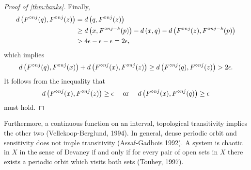\documentclass[12pt,draft,twoside]{book}
\begin{document}
\begin{proof}[Proof of \ref{thm:banks}]
    Finally, 
    \begin{align*}
      d\left( F^{\circ nj}(q), F^{\circ nj}(z) \right) 
      &= d\left( q, F^{\circ nj}(z) \right)  \\
      &\geq  d\left( x, F^{\circ nj-k}(p) \right) - d\left( x,q \right) - d\left( F^{\circ nj}(z), F^{\circ nj - k}(p) \right)  \\
      &> 4\epsilon - \epsilon - \epsilon 
      = 2\epsilon,
    \end{align*}
    which implies
    \begin{equation*}
      d\left( F^{\circ nj}(q), F^{\circ nj}(x) \right) + d\left( F^{\circ nj}(x), F^{\circ nj}(z) \right) 
      \geq d\left( F^{\circ nj}(q), F^{\circ nj}(z) \right)
      > 2\epsilon.
    \end{equation*}
    It follows from the inequality that 
    \begin{equation*}
      d\left( F^{\circ nj}(x), F^{\circ nj}(z) \right) \geq \epsilon \quad\mbox{ or }\quad d\left( F^{\circ nj}(x), F^{\circ nj}(q) \right) \geq \epsilon 
    \end{equation*}
     must hold.
  \end{proof}

  Furthermore, a continuous function on an interval, topological transitivity implies the other two (Vellekoop-Berglund, 1994).
  In general, dense periodic orbit and sensitivity does not imple transitivity (Assaf-Gadbois 1992).
  A system is chaotic in $X$ in the sense of Devaney if and only if for every pair of open sets in $X$ there exists a periodic orbit which visits both sets (Touhey, 1997).
\end{document}
